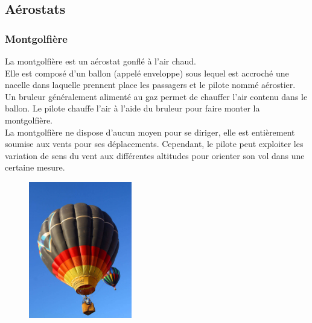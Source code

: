 \subsection{Aérostats}
	\subsubsection{Montgolfière}
	La montgolfière  est un aérostat gonflé à l'air chaud. \\
	
	Elle est composé d'un ballon (appelé enveloppe) sous lequel est accroché une nacelle dans laquelle prennent place les passagers et le pilote nommé aérostier. Un bruleur généralement alimenté au gaz permet de chauffer l'air contenu dans le ballon. Le pilote chauffe l'air à l'aide du bruleur pour faire monter la montgolfière. \\
	
	La montgolfière ne dispose d'aucun moyen pour se diriger, elle est entièrement soumise aux vents pour ses déplacements. Cependant, le pilote peut exploiter les variation de sens du vent aux différentes altitudes pour orienter son vol dans une certaine mesure.
	
	\begin{figure}[H]
  	\centering
    \includegraphics[width=0.4\textwidth]{01-EtudeAeronefs/img/montgolfiere.jpg}
	\end{figure}	
	
